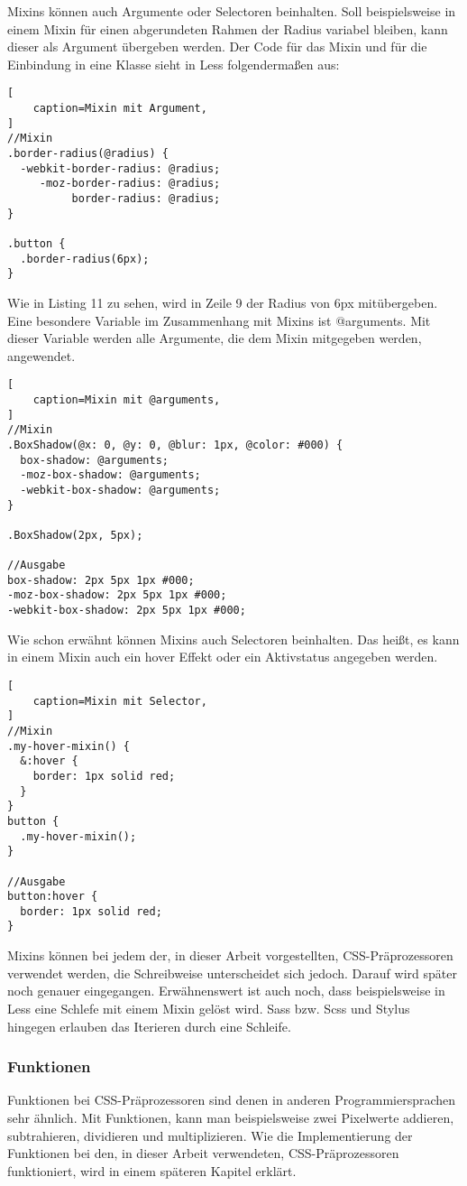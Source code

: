Mixins können auch Argumente oder Selectoren beinhalten. \newline
Soll beispielsweise in einem Mixin für einen abgerundeten Rahmen der Radius variabel bleiben, kann dieser als Argument übergeben werden. Der Code für das Mixin und für die Einbindung in eine Klasse sieht in Less folgendermaßen aus:
\newpage
\begin{lstlisting}[
	caption=Mixin mit Argument,
]
//Mixin
.border-radius(@radius) {
  -webkit-border-radius: @radius;
     -moz-border-radius: @radius;
          border-radius: @radius;
}

.button {
  .border-radius(6px);
}
\end{lstlisting}
Wie in Listing 11 zu sehen, wird in Zeile 9 der Radius von 6px mitübergeben. \autocite[]{thecorelessteam.}\newline 
Eine besondere Variable im Zusammenhang mit Mixins ist @arguments. Mit dieser Variable werden alle Argumente, die dem Mixin mitgegeben werden, angewendet. \autocite[]{Gerchev.2012}
\begin{lstlisting}[
	caption=Mixin mit @arguments,
]
//Mixin
.BoxShadow(@x: 0, @y: 0, @blur: 1px, @color: #000) {
  box-shadow: @arguments;
  -moz-box-shadow: @arguments;
  -webkit-box-shadow: @arguments;
}

.BoxShadow(2px, 5px);

//Ausgabe
box-shadow: 2px 5px 1px #000;
-moz-box-shadow: 2px 5px 1px #000;
-webkit-box-shadow: 2px 5px 1px #000;
\end{lstlisting}
Wie schon erwähnt können Mixins auch Selectoren beinhalten. Das heißt, es kann in einem Mixin auch ein hover Effekt oder ein Aktivstatus angegeben werden.
\begin{lstlisting}[
	caption=Mixin mit Selector,
]
//Mixin
.my-hover-mixin() {
  &:hover {
    border: 1px solid red;
  }
}
button {
  .my-hover-mixin();
}

//Ausgabe
button:hover {
  border: 1px solid red;
}
\end{lstlisting}
Mixins können bei jedem der, in dieser Arbeit vorgestellten, CSS-Präprozessoren verwendet werden, die Schreibweise unterscheidet sich jedoch. Darauf wird später noch genauer eingegangen.
Erwähnenswert ist auch noch, dass beispielsweise in Less eine Schlefe mit einem Mixin gelöst wird. Sass bzw. Scss und Stylus hingegen erlauben das Iterieren durch eine Schleife.
\subsubsection{Funktionen}
Funktionen bei CSS-Präprozessoren sind denen in anderen Programmiersprachen sehr ähnlich. Mit Funktionen, kann man beispielsweise zwei Pixelwerte addieren, subtrahieren, dividieren und multiplizieren. Wie die Implementierung der Funktionen bei den, in dieser Arbeit verwendeten, CSS-Präprozessoren funktioniert, wird in einem späteren Kapitel erklärt.
